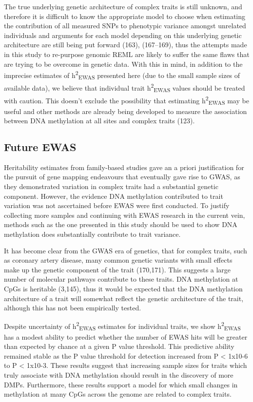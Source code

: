 \documentclass[11pt,oneside]{bristolthesis}
\begin{document}
The true underlying genetic architecture of complex traits is still unknown, and therefore it is difficult to know the appropriate model to choose when estimating the contribution of all measured SNPs to phenotypic variance amongst unrelated individuals and arguments for each model depending on this underlying genetic architecture are still being put forward (163), (167--169), thus the attempts made in this study to re-purpose genomic REML are likely to suffer the same flaws that are trying to be overcome in genetic data. With this in mind, in addition to the imprecise estimates of h\textsuperscript{2}\textsubscript{EWAS} presented here (due to the small sample sizes of available data), we believe that individual trait h\textsuperscript{2}\textsubscript{EWAS} values should be treated with caution. This doesn't exclude the possibility that estimating h\textsuperscript{2}\textsubscript{EWAS} may be useful and other methods are already being developed to measure the association between DNA methylation at all sites and complex traits (123).

\hypertarget{future-ewas-05}{%
\subsection{Future EWAS}\label{future-ewas-05}}

Heritability estimates from family-based studies gave an a priori justification for the pursuit of gene mapping endeavours that eventually gave rise to GWAS, as they demonstrated variation in complex traits had a substantial genetic component. However, the evidence DNA methylation contributed to trait variation was not ascertained before EWAS were first conducted. To justify collecting more samples and continuing with EWAS research in the current vein, methods such as the one presented in this study should be used to show DNA methylation does substantially contribute to trait variance.

It has become clear from the GWAS era of genetics, that for complex traits, such as coronary artery disease, many common genetic variants with small effects make up the genetic component of the trait (170,171). This suggests a large number of molecular pathways contribute to these traits. DNA methylation at CpGs is heritable (3,145), thus it would be expected that the DNA methylation architecture of a trait will somewhat reflect the genetic architecture of the trait, although this has not been empirically tested.

Despite uncertainty of h\textsuperscript{2}\textsubscript{EWAS} estimates for individual traits, we show h\textsuperscript{2}\textsubscript{EWAS} has a modest ability to predict whether the number of EWAS hits will be greater than expected by chance at a given P value threshold. This predictive ability remained stable as the P value threshold for detection increased from P \textless{} 1x10-6 to P \textless{} 1x10-3. These results suggest that increasing sample sizes for traits which truly associate with DNA methylation should result in the discovery of more DMPs. Furthermore, these results support a model for which small changes in methylation at many CpGs across the genome are related to complex traits.
\end{document}
